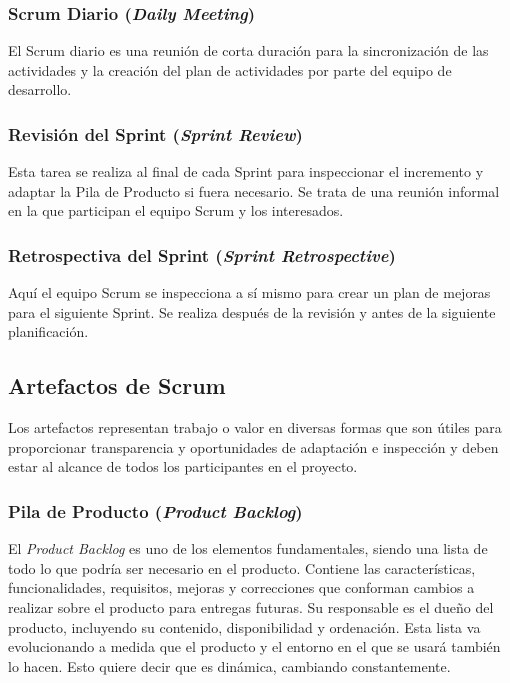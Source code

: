 \subsubsection{Scrum Diario (\textit{Daily Meeting})}
El Scrum diario \cite{Schwaber2017} es una reunión de corta duración para la sincronización de las actividades y la creación del plan de actividades por parte del equipo de desarrollo.

\subsubsection{Revisión del Sprint (\textit{Sprint Review})}
Esta tarea se realiza al final de cada Sprint para inspeccionar el incremento y adaptar la Pila de Producto si fuera necesario. Se trata de una reunión informal en la que participan el equipo Scrum y los interesados.

\subsubsection{Retrospectiva del Sprint (\textit{Sprint Retrospective})}
Aquí el equipo Scrum se inspecciona a sí mismo para crear un plan de mejoras para el siguiente Sprint. Se realiza después de la revisión y antes de la siguiente planificación.

\newpage

\subsection{Artefactos de Scrum}
Los artefactos representan trabajo o valor en diversas formas que son útiles para proporcionar transparencia y oportunidades de adaptación e inspección y deben  estar al alcance de todos los participantes en el proyecto.

\subsubsection{Pila de Producto (\textit{Product Backlog})}
El \textit{Product Backlog} es uno de los elementos fundamentales, siendo una lista de todo lo que podría ser necesario en el producto. Contiene las características, funcionalidades, requisitos, mejoras y correcciones que conforman cambios a realizar sobre el producto para entregas futuras. Su responsable es el dueño del producto, incluyendo su contenido, disponibilidad y ordenación. Esta lista va evolucionando a medida que el producto y el entorno en el que se usará también lo hacen. Esto quiere decir que es dinámica, cambiando constantemente.

